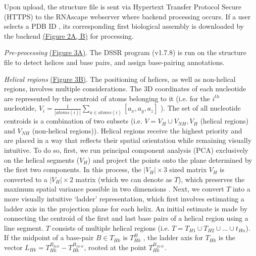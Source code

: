 Upon upload, the structure file is sent via Hypertext Transfer Protocol Secure (HTTPS) to the RNAscape webserver where backend processing occurs. If a user selects a PDB ID \citep{berman2000protein}, its corresponding first biological assembly is downloaded by the backend \hyperref[fig:rnascape2]{(Figure 2A, B)} for processing.

\textit{Pre-processing} \hyperref[fig:rnascape3]{(Figure 3A)}. The DSSR program (v1.7.8) \citep{lu2015dssr} is run on the structure file to detect helices and base pairs, and assign base-pairing annotations.

\textit{Helical regions} \hyperref[fig:rnascape3]{(Figure 3B)}. The positioning of helices, as well as non-helical regions, involves multiple considerations. The 3D coordinates of each nucleotide are represented by the centroid of atoms belonging to it (i.e. for the $i^{th}$ nucleotide, $V_i  = \frac{1}{|atoms(i)|}\sum\limits_{a\in atoms(i)}[a_x,a_y,a_z]$
). The set of all nucleotide centroids is a combination of two subsets (i.e. 
$V = V_H \cup V_{NH}, V_H$ (helical regions) and $V_{NH}$ (non-helical regions)). Helical regions receive the highest priority and are placed in a way that reflects their spatial orientation while remaining visually intuitive. To do so, first, we run principal component analysis (PCA) exclusively on the helical segments ($V_H$) and project the points onto the plane determined by the first two components. In this process, the $|V_H|\times 3$ sized matrix $V_H$ is converted to a $|V_H|\times 2$ matrix (which we can denote as $T$), which preserves the maximum spatial variance possible in two dimensions \citep{Pearson1901}. Next, we convert $T$ into a more visually intuitive ‘ladder’ representation, which first involves estimating a ladder axis in the projection plane for each helix. An initial estimate is made by connecting the centroid of the first and last base pairs of a helical region using a line segment. $T$ consists of multiple helical regions (i.e. $T=T_{H1}\cup T_{H2}\cup ... \cup t_{Hn}$). If the midpoint of a base-pair $B \in T_{Hk}$ is $T_{Hk}^{B}$
, the ladder axis for $T_{Hk}$ is the vector $L_{Hk} = T_{Hk}^{B_{last}} - T_{Hk}^{B_{first}}$, rooted at the point $T_{Hk}^{B_{first}}$.


